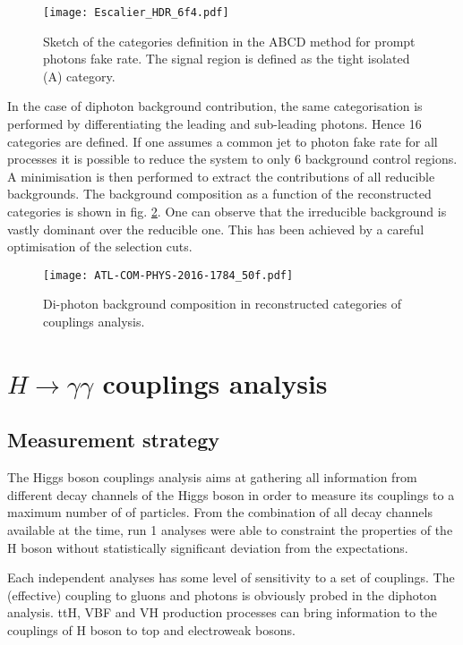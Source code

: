 \begin{figure}[htbp]
\centering
\texttt{[image: Escalier\_HDR\_6f4.pdf]}
\caption{\label{fig:org2dbdc47}
Sketch of the categories definition in the ABCD method for prompt photons fake rate. The signal region is defined as the tight isolated (A) category.\cite{Escalier_HDR}}
\end{figure}

In the case of diphoton background contribution, the same categorisation is performed by differentiating the leading and sub-leading photons.
Hence 16 categories are defined.
If one assumes a common jet to photon fake rate for all processes it is possible to reduce the system to only 6 background control regions.
A minimisation is then performed to extract the contributions of all reducible backgrounds.
The background composition as a function of the reconstructed categories is shown in fig. \ref{fig:org61f8f4a}.
One can observe that the irreducible background is vastly dominant over the reducible one.
This has been achieved by a careful optimisation of the selection cuts.

\begin{figure}[htbp]
\centering
\texttt{[image: ATL-COM-PHYS-2016-1784\_50f.pdf]}
\caption{\label{fig:org61f8f4a}
Di-photon background composition in reconstructed categories of couplings analysis.\cite{ATL-COM-PHYS-2016-1784}}
\end{figure}


\chapter{$H\rightarrow\gamma\gamma$ couplings analysis}
\label{sec:org4860f0b}
\section{Measurement strategy}
\label{sec:org1aa713f}
The Higgs boson couplings analysis aims at gathering all information from different decay channels of the Higgs boson in order to measure its couplings to a maximum number of of particles.
From the combination of all decay channels available at the time, run 1 analyses \cite{ATLAS-CONF-2013-012,CMS-HIG-14-009,ATLAS-CONF-2014-009,ATLAS-CONF-2014-010,CERN-EP-2016-100} were able to constraint the properties of the H boson without statistically significant deviation from the expectations.

Each independent analyses has some level of sensitivity to a set of couplings.
The (effective) coupling to gluons and photons is obviously probed in the diphoton analysis.
ttH, VBF and VH production processes can bring information to the couplings of H boson to top and electroweak bosons.

